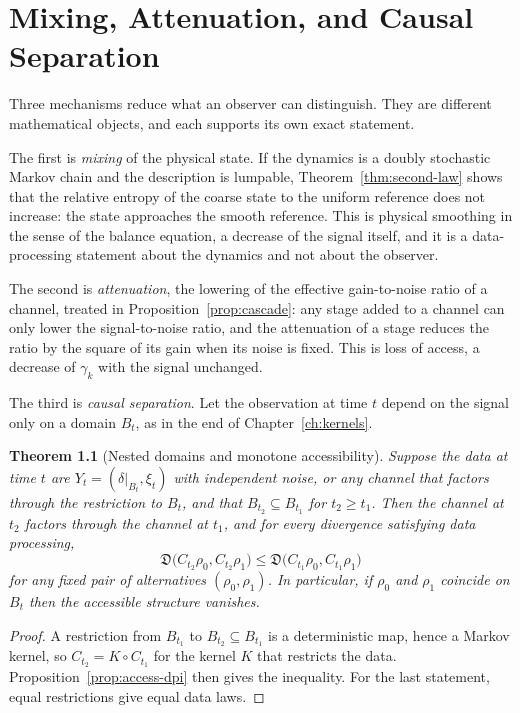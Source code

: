 \documentclass[11pt,oneside]{book}
\newtheorem{theorem}{Theorem}[chapter]
\theoremstyle{definition}
\theoremstyle{remark}
\begin{document}
\chapter{Mixing, Attenuation, and Causal Separation}\label{ch:mixing}

Three mechanisms reduce what an observer can distinguish. They are different mathematical objects, and each supports its own exact statement.

The first is \emph{mixing} of the physical state. If the dynamics is a doubly stochastic Markov chain and the description is lumpable, Theorem~\ref{thm:second-law} shows that the relative entropy of the coarse state to the uniform reference does not increase: the state approaches the smooth reference. This is physical smoothing in the sense of the balance equation, a decrease of the signal itself, and it is a data-processing statement about the dynamics and not about the observer.

The second is \emph{attenuation}, the lowering of the effective gain-to-noise ratio of a channel, treated in Proposition~\ref{prop:cascade}: any stage added to a channel can only lower the signal-to-noise ratio, and the attenuation of a stage reduces the ratio by the square of its gain when its noise is fixed. This is loss of access, a decrease of $\gamma_k$ with the signal unchanged.

The third is \emph{causal separation}. Let the observation at time $t$ depend on the signal only on a domain $B_t$, as in the end of Chapter~\ref{ch:kernels}.

\begin{theorem}[Nested domains and monotone accessibility]\label{thm:nested}
Suppose the data at time $t$ are $Y_t=(\delta|_{B_t},\xi_t)$ with independent noise, or any channel that factors through the restriction to $B_t$, and that $B_{t_2}\subseteq B_{t_1}$ for $t_2\geq t_1$. Then the channel at $t_2$ factors through the channel at $t_1$, and for every divergence satisfying data processing,
\[
\mathfrak D\bigl(C_{t_2}\rho_0,C_{t_2}\rho_1\bigr)\leq\mathfrak D\bigl(C_{t_1}\rho_0,C_{t_1}\rho_1\bigr)
\]
for any fixed pair of alternatives $(\rho_0,\rho_1)$. In particular, if $\rho_0$ and $\rho_1$ coincide on $B_{t}$ then the accessible structure vanishes.
\end{theorem}

\begin{proof}
A restriction from $B_{t_1}$ to $B_{t_2}\subseteq B_{t_1}$ is a deterministic map, hence a Markov kernel, so $C_{t_2}=K\circ C_{t_1}$ for the kernel $K$ that restricts the data. Proposition~\ref{prop:access-dpi} then gives the inequality. For the last statement, equal restrictions give equal data laws.
\end{proof}
\end{document}

